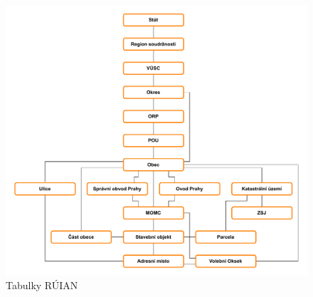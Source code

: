 \begin{figure}[!h]
    \centering
    \includegraphics[width=\textwidth]{figures/ruian_diagram.pdf}
    \caption{Tabulky RÚIAN}
    \label{fig:ruian_tables}
\end{figure}